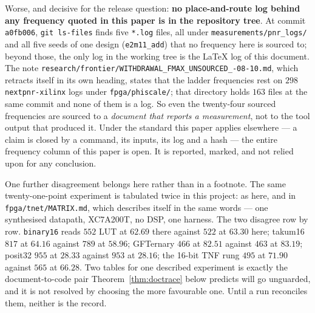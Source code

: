 Worse, and decisive for the release question: \textbf{no place-and-route log behind
any frequency quoted in this paper is in the repository tree}. At commit \texttt{a0fb006}, \texttt{git ls-files} finds five \texttt{*.log} files, all under \texttt{measurements/pnr\_logs/} and all five seeds of one design (\texttt{e2m11\_add}) that no frequency here is sourced to; beyond those, the only log in the working tree is the \LaTeX{} log of this document. The note \texttt{research/\allowbreak frontier/\allowbreak WITHDRAWAL\_\allowbreak FMAX\_\allowbreak UNSOURCED\_-08-10.md}, which retracts itself in its own heading, states that the ladder frequencies
rest on $298$ \texttt{nextpnr-xilinx} logs under \texttt{fpga/phiscale/}; that
directory holds $163$ files at the same commit and none of them is a log. So even the twenty-four
sourced frequencies are sourced to a \emph{document that reports a measurement},
not to the tool output that produced it. Under the standard this paper applies
elsewhere --- a claim is closed by a command, its inputs, its log and a hash --- the
entire frequency column of this paper is open. It is reported, marked, and not
relied upon for any conclusion.

One further disagreement belongs here rather than in a footnote. The same
twenty-one-point experiment is tabulated twice in this project: as
 here, and in \texttt{fpga/tnet/MATRIX.md}, which
describes itself in the same words --- one synthesised datapath, XC7A200T, no DSP,
one harness. The two disagree row by row. \texttt{binary16} reads $552$ LUT at
$62.69$ there against $522$ at $63.30$ here; takum16 $817$ at $64.16$ against $789$
at $58.96$; GFTernary $466$ at $82.51$ against $463$ at $83.19$; posit32 $955$ at
$28.33$ against $953$ at $28.16$; the 16-bit TNF rung $495$ at $71.90$ against $565$
at $66.28$. Two tables for one described experiment is exactly the document-to-code
pair Theorem~\ref{thm:doctrace} below predicts will go unguarded, and it is not
resolved by choosing the more favourable one. Until a run reconciles them, neither
is the record.

